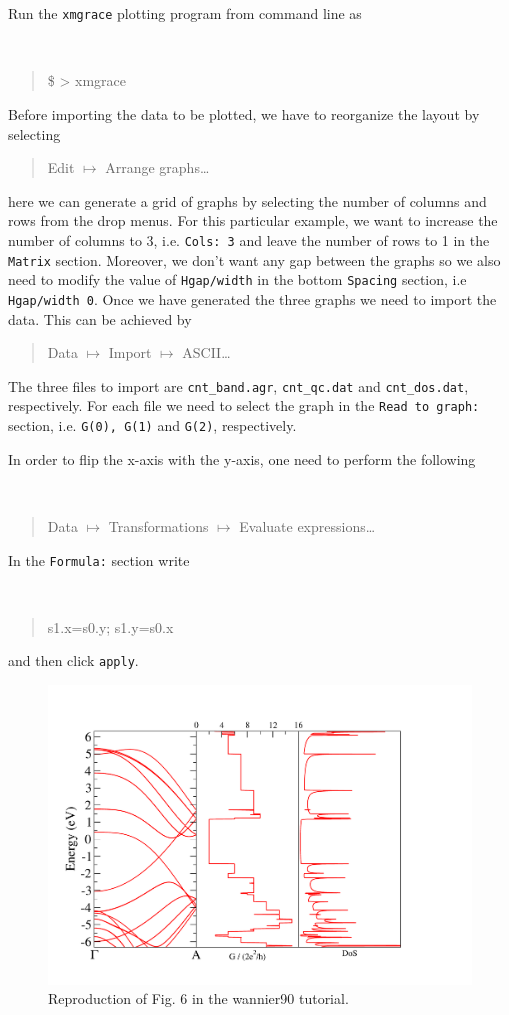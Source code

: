 \begin{tcolorbox}[colback=blue!5!white,title=XMGRACE TUTORIAL]
Run the {\tt xmgrace} plotting program from command line as

{\tt
\begin{quote}
\$ > xmgrace
\end{quote}
}

Before importing the data to be plotted, we have to reorganize the layout by selecting

{\tt

\begin{quote}

Edit $\mapsto$ Arrange graphs\dots

\end{quote}
}
here we can generate a grid of graphs by selecting the number of columns and rows from the drop menus. For this particular example, we want to increase the number of columns to 3, i.e. {\tt Cols: 3} and leave the number of rows to 1 in the {\tt Matrix} section. Moreover, we don't want any gap between the graphs so we also need to modify the value of {\tt Hgap/width} in the bottom {\tt Spacing} section, i.e {\tt Hgap/width 0}. Once we have generated the three graphs we need to import the data. This can be achieved by
{\tt \begin{quote}
Data $\mapsto$ Import $\mapsto$ ASCII\dots
\end{quote}}

The three files to import are {\tt cnt\_band.agr}, {\tt cnt\_qc.dat} and {\tt cnt\_dos.dat}, respectively. For each file we need to select the graph in the {\tt Read to graph:} section, i.e. {\tt G(0), G(1)} and {\tt G(2)}, respectively.

In order to flip the x-axis with the y-axis, one need to perform the following
{\tt
\begin{quote}
Data $\mapsto$ Transformations $\mapsto$ Evaluate expressions\dots
\end{quote}
}
In the {\tt Formula:} section write
{\tt
\begin{quote}
s1.x=s0.y; s1.y=s0.x
\end{quote}}
and then click {\tt apply}.
\end{tcolorbox}



\begin{figure}[b!]
\centering
\includegraphics[width=0.7\columnwidth]{figure/example13/cnt55_band.pdf}
\caption{Reproduction of Fig. 6 in the {\sc wannier90} tutorial.}\label{fig13.1}
\end{figure}
